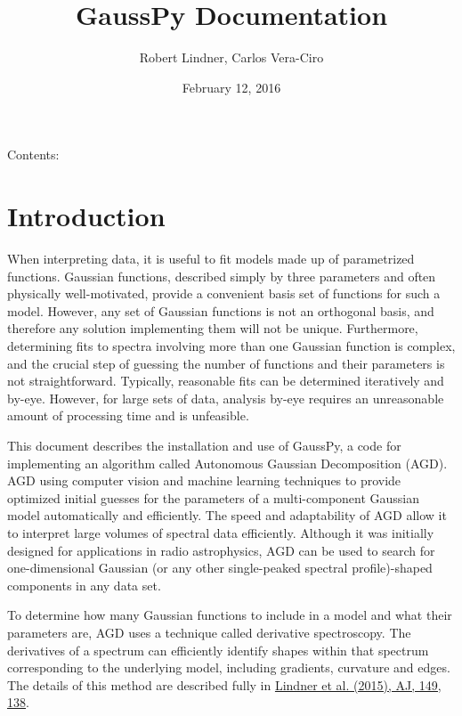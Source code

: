\documentclass[letterpaper,10pt,openany,oneside]{sphinxmanual}
\title{GaussPy Documentation}
\date{February 12, 2016}
\author{Robert Lindner, Carlos Vera-Ciro}
\begin{document}
\maketitle
\tableofcontents
{}\label{index::doc}


Contents:


\chapter{Introduction}
\label{intro:welcome-to-gausspy-s-documentation}\label{intro:introduction}\label{intro:intro}\label{intro::doc}
When interpreting data, it is useful to fit models made up of parametrized functions. Gaussian functions, described simply by three parameters and often physically well-motivated, provide a convenient basis set of functions for such a model. However, any set of Gaussian functions is not an orthogonal basis, and therefore any solution implementing them will not be unique. Furthermore, determining fits to spectra involving more than one Gaussian function is complex, and the crucial step of guessing the number of functions and their parameters is not straightforward. Typically, reasonable fits can be determined iteratively and by-eye. However, for large sets of data, analysis by-eye requires an unreasonable amount of processing time and is unfeasible.

This document describes the installation and use of GaussPy, a code for implementing an algorithm called Autonomous Gaussian Decomposition (AGD). AGD using computer vision and machine learning techniques to provide optimized initial guesses for the parameters of a multi-component Gaussian model automatically and efficiently. The speed and adaptability of AGD allow it to interpret large volumes of spectral data efficiently. Although it was initially designed for applications in radio astrophysics, AGD can be used to search for one-dimensional Gaussian (or any other single-peaked spectral profile)-shaped components in any data set.

To determine how many Gaussian functions to include in a model and what their parameters are, AGD uses a technique called derivative spectroscopy. The derivatives of a spectrum can efficiently identify shapes within that spectrum corresponding to the underlying model, including gradients, curvature and edges. The details of this method are described fully in \href{http://iopscience.iop.org/article/10.1088/0004-6256/149/4/138/meta}{Lindner et al. (2015), AJ, 149, 138}.
\end{document}
